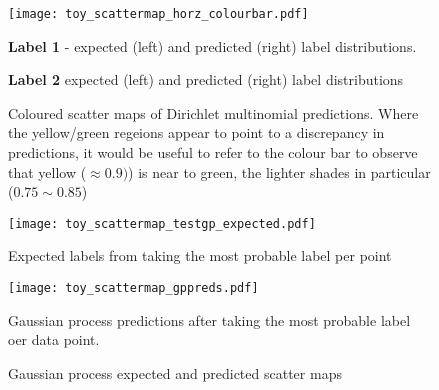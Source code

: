 \begin{figure}
    \texttt{[image: toy\_scattermap\_horz\_colourbar.pdf]}
    \begin{minipage}{\linewidth}
        \caption*{\textbf{Label 1} - expected (left) and predicted (right) label distributions.}
    \end{minipage}
    \begin{minipage}{\linewidth}
        \caption*{\textbf{Label 2} expected (left) and predicted (right) label distributions}
    \end{minipage}
    \caption{Coloured scatter maps of Dirichlet multinomial predictions. Where the yellow/green regeions appear to point to a discrepancy in predictions, it would be useful to refer to the colour bar to observe that yellow ($\approx0.9)$) is near to green, the lighter shades in particular ($0.75 \sim 0.85$)}
    \label{fig:toy_dmpredplots}
\end{figure}

\begin{figure}
    \begin{minipage}{\textwidth}
        \texttt{[image: toy\_scattermap\_testgp\_expected.pdf]}
        \caption*{Expected labels from taking the most probable label per point}
    \end{minipage}
    \begin{minipage}{\textwidth}
        \texttt{[image: toy\_scattermap\_gppreds.pdf]}
        \caption*{Gaussian process predictions after taking the most probable label oer data point.}
    \end{minipage}
    \caption{Gaussian process expected and predicted scatter maps}
\end{figure}



